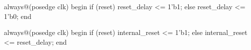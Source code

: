 \begin{vcode}
always@(posedge clk)
begin
    if (reset)
        reset_delay <= 1'b1;
    else
        reset_delay <= 1'b0;
end

always@(posedge clk)
begin
    if (reset)
        internal_reset <= 1'b1;
    else
        internal_reset <= reset_delay;
end
\end{vcode}

